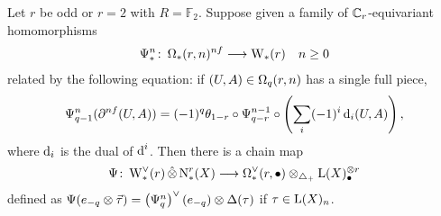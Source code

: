 \begin{proposition}\label{prop:omegarm}
	Let $r$ be odd or $r=2$ with $R=\mathbb{F}_2$. Suppose given a family of $\Cyc_r$-equivariant homomorphisms
	\begin{align*}
		\Psiom_*^n \colon  \Om(r,n)^{\nf}&\lra \rW(r) & n\geq 0
	\end{align*}
	related by the following equation: if $(U,A)\in \Om[q](r,n)$ has a single full piece,
	\begin{equation}
		 \label{it:1a}
		\Psiom^n_{q-1}(\partial^{\nf} (U,A)) = (-1)^q\theta_{1-r}\circ \Psiom^{n-1}_{q-r}\circ \left(\sum_i (-1)^i \d_i(U,A)\right),
	\end{equation}
	where $\d_i$ is the dual of $\d^i$. Then there is a chain map
	\[
	\Psi \colon  \rWd(r)\hotimes \rchains(X)\lra \Omd(r,\bullet) \ot _{\asimplex} \rA(X)_\bullet^{ \ot  r}
	\]
	defined as $\Psi(e_{-q} \ot  \vec{\tau}) = \left(\Psiom^n_q\right)^\vee(e_{-q}) \ot  \Delta(\tau)$ if $\tau\in \rA(X)_{n}$.
\end{proposition}
\def\diaglin{\Delta}


